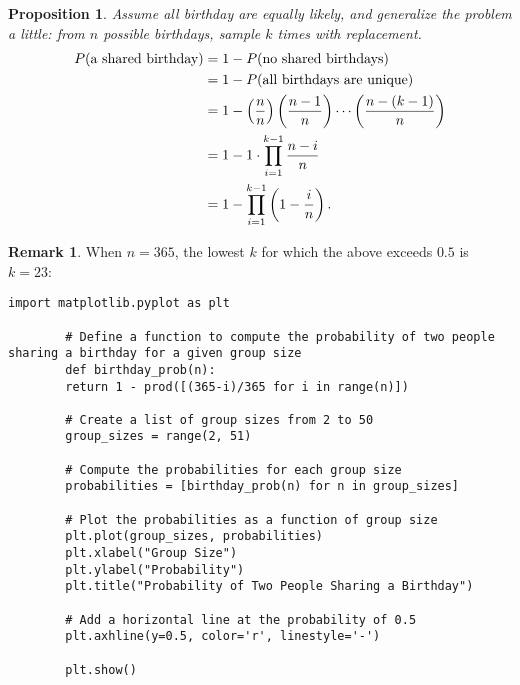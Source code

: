 \documentclass[12pt,openany]{book}
\newtheorem{proposition}[theorem]{Proposition}
\theoremstyle{definition}
\newtheorem{remark}{Remark}[chapter]
\newcommand{\of}[1]{\left( #1 \right)}
\begin{document}
	\begin{tcolorbox}[colback=white,colframe=procolor,arc=5pt,title={\color{white}\bf Generalization of Birthday Problem}]
		\begin{proposition}
			Assume all birthday are equally likely, and generalize the problem a little: \textnormal{from $n$ possible birthdays, sample $k$ times with replacement}. \begin{align*}
			P(\textnormal{a shared birthday})&=1-P(\textnormal{no shared birthdays})\\
			&=1-P(\textnormal{all birthdays are unique})\\
			&=1-\of{\frac{n}{n}}\of{\frac{n-1}{n}}\cdots\of{\frac{n-(k-1)}{n}}\\
			&=1-1\cdot \prod_{i=1}^{k-1}\frac{n-i}{n}\\
			&=1-\prod_{i=1}^{k-1}\of{1-\frac{i}{n}}.
			\end{align*}
		\end{proposition}
	\end{tcolorbox}
	
	\newpage
	\begin{remark}
		When $n=365$, the lowest $k$ for which the above exceeds $0.5$ is $k=23$: \begin{figure}[ht!]
			\centering
		\end{figure}
		\begin{lstlisting}[style=sage, caption={Birthday Bound (Sage)},captionpos=t]
		import matplotlib.pyplot as plt
		
		# Define a function to compute the probability of two people sharing a birthday for a given group size
		def birthday_prob(n):
		return 1 - prod([(365-i)/365 for i in range(n)])
		
		# Create a list of group sizes from 2 to 50
		group_sizes = range(2, 51)
		
		# Compute the probabilities for each group size
		probabilities = [birthday_prob(n) for n in group_sizes]
		
		# Plot the probabilities as a function of group size
		plt.plot(group_sizes, probabilities)
		plt.xlabel("Group Size")
		plt.ylabel("Probability")
		plt.title("Probability of Two People Sharing a Birthday")
		
		# Add a horizontal line at the probability of 0.5
		plt.axhline(y=0.5, color='r', linestyle='-')
		
		plt.show()
		\end{lstlisting}
	\end{remark}
	
\end{document}
